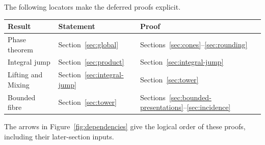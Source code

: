 The following locators make the deferred proofs explicit.
\begin{center}
\small
\begin{tabular}{lll}
\toprule
Result & Statement & Proof \\
\midrule
Phase theorem & Section~\ref{sec:global} & Sections~\ref{sec:cones}--\ref{sec:rounding} \\
Integral jump & Section~\ref{sec:product} & Section~\ref{sec:integral-jump} \\
Lifting and Mixing & Section~\ref{sec:integral-jump} & Section~\ref{sec:tower} \\
Bounded fibre & Section~\ref{sec:tower} & Sections~\ref{sec:bounded-presentations}--\ref{sec:incidence} \\
\bottomrule
\end{tabular}
\end{center}
The arrows in Figure~\ref{fig:dependencies} give the logical order of
these proofs, including their later-section inputs.

